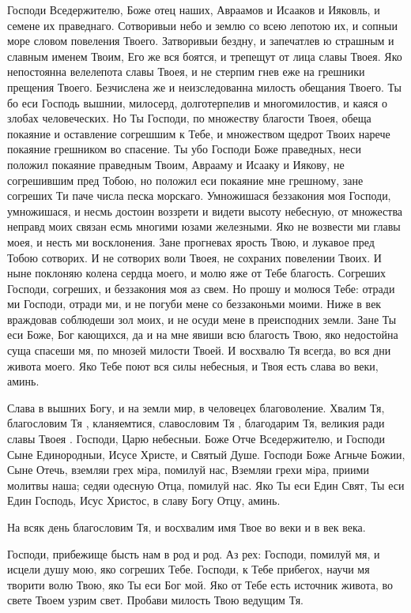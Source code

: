 \begin{mymulticols}
Господи Вседержителю, Боже отец наших, Авраамов и Исааков и Ияковль, и семене их праведнаго. Сотворивыи небо и землю со всею лепотою их, и сопныи море словом повеления Твоего. Затворивыи бездну, и запечатлев ю страшным и славным именем Твоим, Его же вся боятся, и трепещут от лица славы Твоея. Яко непостоянна велелепота славы Твоея, и не стерпим гнев еже на грешники прещения Твоего. Безчислена же и неизследованна милость обещания Твоего. Ты бо еси Господь вышнии, милосерд, долготерпелив и многомилостив, и каяся о злобах человеческих. Но Ты Господи, по множеству благости Твоея, обеща покаяние и оставление согрешшим к Тебе, и множеством щедрот Твоих нарече покаяние грешником во спасение. Ты убо Господи Боже праведных, неси положил покаяние праведным Твоим, Аврааму и Исааку и Иякову, не согрешившим пред Тобою, но положил еси покаяние мне грешному, зане согреших Ти паче числа песка морскаго. Умножишася беззакония моя Господи, умножишася, и несмь достоин воззрети и видети высоту небесную, от множества неправд моих связан есмь многими юзами железными. Яко не возвести ми главы моея, и несть ми восклонения. Зане прогневах ярость Твою, и лукавое пред Тобою сотворих. И не сотворих воли Твоея, не сохраних повелении Твоих. И ныне поклоняю колена сердца моего, и молю яже от Тебе благость. Согреших Господи, согреших, и беззакония моя аз свем. Но прошу и молюся Тебе: отради ми Господи, отради ми, и не погуби мене со беззаконьми моими. Ниже в век враждовав соблюдеши зол моих, и не осуди мене в преисподних земли. Зане Ты еси Боже, Бог кающихся, да и на мне явиши всю благость Твою, яко недостойна суща спасеши мя, по мнозей милости Твоей. И восхвалю Тя всегда, во вся дни живота моего. Яко Тебе поют вся силы небесныя, и Твоя есть слава во веки, аминь.

Слава в вышних Богу, и на земли мир, в человецех благоволение. Хвалим Тя, благословим Тя , кланяемтися, славословим Тя , благодарим Тя, великия ради славы Твоея . Господи, Царю небесныи. Боже Отче Вседержителю, и Господи Сыне Единородныи, Исусе Христе, и Святый Душе. Господи Боже Агньче Божии, Сыне Отечь, вземляи грех мiра, помилуй нас, Вземляи грехи мiра, приими молитвы наша; седяи одесную Отца, помилуй нас. Яко Ты еси Един Свят, Ты еси Един Господь, Исус Христос, в славу Богу Отцу, аминь.

На всяк день благословим Тя, и восхвалим имя Твое во веки и в век века.

Господи, прибежище бысть нам в род и род. Аз рех: Господи, помилуй мя, и исцели душу мою, яко согреших Тебе. Господи, к Тебе прибегох, научи мя творити волю Твою, яко Ты еси Бог мой. Яко от Тебе есть источник живота, во свете Твоем узрим свет. Пробави милость Твою ведущим Тя.


\end{mymulticols}
